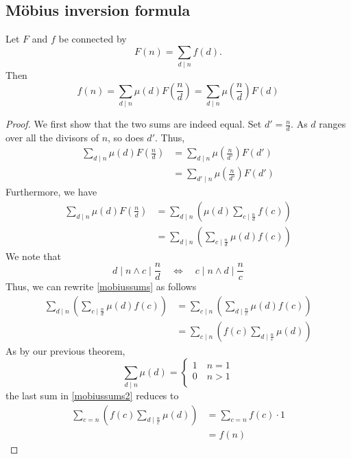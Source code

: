 \documentclass{report}
\begin{document}
\subsection*{M\"{o}bius inversion formula}
Let $F$ and $f$ be connected by \[F(n)=\sum_{d \mid n} f(d).\]
Then 
\[ f(n)=\sum_{d\mid n} \mu(d) F(\frac{n}{d}) = \sum_{d \mid n} \mu(\frac{n}{d}) F(d)\]
\begin{proof}
	We first show that the two sums are indeed equal. Set $d'=\frac{n}{d}$. As $d$ ranges over all the divisors of $n$, so does $d'$. Thus, 
	\begin{equation*}
	\begin{aligned}
	\sum_{d\mid n} \mu(d) F(\frac{n}{d})&=\sum_{d\mid n} \mu(\frac{n}{d'}) F(d')\\
	&=\sum_{d'\mid n} \mu(\frac{n}{d'}) F(d')
	\end{aligned}
	\end{equation*} 
	Furthermore, we have
	\begin{equation}\label{mobiussums}
	\begin{aligned}
	\sum_{d\mid n} \mu(d) F(\frac{n}{d}) &= \sum_{d\mid n}\left(\mu(d)\sum_{c\mid \frac{n}{d}}f(c) \right)\\
	&= \sum_{d\mid n}\left(\sum_{c\mid \frac{n}{d}}\mu(d)f(c) \right)
	\end{aligned}
	\end{equation}
	We note that
	\begin{equation*}
	d\mid n \wedge c\mid\frac{n}{d} \quad \Leftrightarrow \quad c\mid n \wedge d\mid \frac{n}{c}
	\end{equation*}
	Thus, we can rewrite \eqref{mobiussums} as follows
	\begin{equation}\label{mobiussums2}
	\begin{aligned}
	\sum_{d\mid n}\left(\sum_{c\mid \frac{n}{d}}\mu(d)f(c) \right)&= \sum_{c\mid n}\left(\sum_{d\mid \frac{n}{c}}\mu(d)f(c) \right)\\
	&= \sum_{c\mid n}\left(f(c)\sum_{d\mid \frac{n}{c}}\mu(d) \right)
	\end{aligned}
	\end{equation}
	As by our previous theorem,
				\[ \sum_{d \mid n} \mu(d) = \left \{
				\begin{array}{lcl}
				1 \quad n=1\\
				0 \quad n>1\\
				\end{array}
				\right.
				\]
	the last sum in \eqref{mobiussums2} reduces to 
	\begin{equation*}
	\begin{aligned}
	\sum_{c=n}\left(f(c)\sum_{d\mid \frac{n}{c}}\mu(d) \right) &= \sum_{c=n}f(c)\cdot 1\\
	&=f(n)
	\end{aligned}
	\end{equation*}	
\end{proof}
\end{document}
